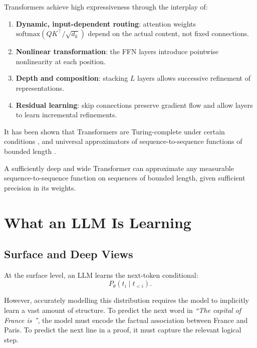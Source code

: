 \documentclass[11pt,a4paper]{article}
\theoremstyle{definition}
\theoremstyle{plain}
\begin{document}
Transformers achieve high expressiveness through the interplay of:
\begin{enumerate}[leftmargin=2em, itemsep=2pt]
  \item \textbf{Dynamic, input-dependent routing}: attention weights
        $\mathrm{softmax}(QK^\top/\sqrt{d_k})$ depend on the actual content,
        not fixed connections.
  \item \textbf{Nonlinear transformation}: the FFN layers introduce pointwise
        nonlinearity at each position.
  \item \textbf{Depth and composition}: stacking $L$ layers allows successive
        refinement of representations.
  \item \textbf{Residual learning}: skip connections preserve gradient flow and
        allow layers to learn incremental refinements.
\end{enumerate}

It has been shown that Transformers are Turing-complete under certain conditions
\cite{perez2021turing}, and universal approximators of sequence-to-sequence functions
of bounded length \cite{yun2020transformers}.

\begin{keyresult}
A sufficiently deep and wide Transformer can approximate any measurable
sequence-to-sequence function on sequences of bounded length,
given sufficient precision in its weights.
\end{keyresult}

\section{What an LLM Is Learning}

\subsection{Surface and Deep Views}

At the surface level, an LLM learns the next-token conditional:
\[
  P_\theta(t_i \mid t_{<i}).
\]

However, accurately modelling this distribution requires the model to implicitly
learn a vast amount of structure. To predict the next word in
\emph{``The capital of France is \underline{\hspace{1em}}''},
the model must encode the factual association between France and Paris.
To predict the next line in a proof, it must capture the relevant logical step.
\end{document}
